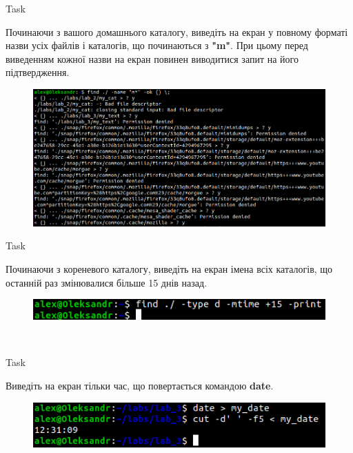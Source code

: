 \documentclass[a4paper,12pt]{article}
\newcommand{\RomanNumeralCaps}[1]{\MakeUppercase{\romannumeral #1}}
\begin{document}
    \begin{center}
        \Large{Task \RomanNumeralCaps{8}}
    \end{center}
    Починаючи з вашого домашнього каталогу, виведіть на екран у повному форматі назви усіх файлів і каталогів, що починаються з \textbf{"m"}. 
    При цьому перед виведенням кожної назви на екран повинен виводитися запит на його підтвердження.
    \begin{figure}[h!]
        \begin{minipage}[h]{1\linewidth}
            \centering
            \includegraphics[width=0.8\linewidth]{Prt sc/Figure_8.png}  
        \end{minipage}
    \end{figure}

    \begin{center}
        \Large{Task \RomanNumeralCaps{9}}
    \end{center}
    Починаючи з кореневого каталогу, виведіть на екран імена всіх каталогів, що останній раз змінювалися більше 15 днів назад.
    \begin{figure}[h!]
        \begin{minipage}[h]{1\linewidth}
            \centering
            \includegraphics[width=0.5\linewidth]{Prt sc/Figure_9.png}  
        \end{minipage}
    \end{figure} \\

\newpage
    \begin{center}
        \Large{Task \RomanNumeralCaps{10}}
    \end{center}
    Виведіть на екран тільки час, що повертається командою \textbf{date}.
    \begin{figure}[h!]
        \begin{minipage}[h]{1\linewidth}
            \centering
            \includegraphics[width=0.5\linewidth]{Prt sc/Figure_10.png}  
        \end{minipage}
    \end{figure}
\end{document}
